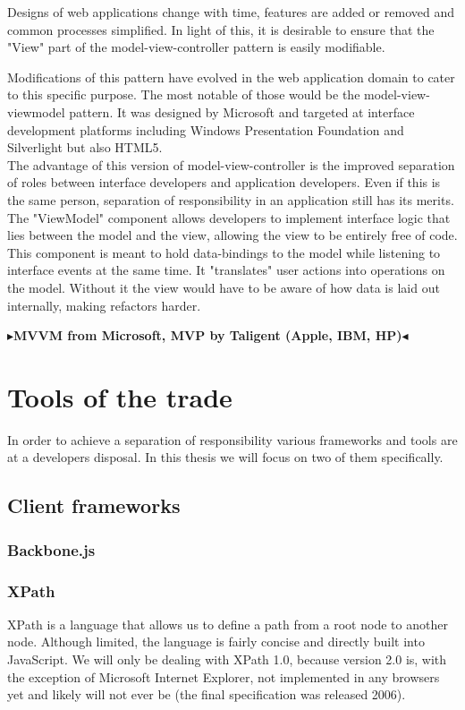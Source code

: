 \documentclass[twoside,11pt,openright]{report}
\newcommand{\todo}[1]{{\color[rgb]{.5,0,0}\textbf{$\blacktriangleright$#1$\blacktriangleleft$}}}
\begin{document}
Designs of web applications change with time, features are added or
removed and common processes simplified. In light of this, it is
desirable to ensure that the "View" part of the model-view-controller
pattern is easily modifiable.

Modifications of this pattern have evolved in the web application domain to
cater to this specific purpose. The most notable of those would be the
model-view-viewmodel pattern. It was designed by Microsoft and targeted at
interface development platforms including Windows Presentation Foundation and
Silverlight but also HTML5.\\
The advantage of this version of model-view-controller is the improved
separation of roles between interface developers and application developers.
Even if this is the same person, separation of responsibility in an application
still has its merits.\\
The "ViewModel" component allows developers to implement interface logic that
lies between the model and the view, allowing the view to be entirely free
of code. This component is meant to hold data-bindings to the model while
listening to interface events at the same time. It "translates" user actions
into operations on the model. Without it the view would have to be aware of how
data is laid out internally, making refactors harder.

\todo{MVVM from Microsoft, MVP by Taligent (Apple, IBM, HP)}


\chapter{Tools of the trade}
In order to achieve a separation of responsibility various frameworks and tools
are at a developers disposal. In this thesis we will focus on two of them
specifically.
\section{Client frameworks}
\subsection{Backbone.js}
\subsection{XPath}
XPath is a language that allows us to define a path from a root node to another
node. Although limited, the language is fairly concise and directly built into
JavaScript. We will only be dealing with XPath 1.0, because version 2.0 is, with
the exception of Microsoft Internet Explorer, not implemented in any browsers
yet and likely will not ever be (the final specification was released 2006).
\end{document}
